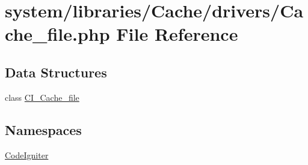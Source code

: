 \hypertarget{_cache__file_8php}{\section{system/libraries/\-Cache/drivers/\-Cache\-\_\-file.php File Reference}
\label{_cache__file_8php}
}
\subsection*{Data Structures}
\begin{DoxyCompactItemize}
\item 
class \hyperlink{class_c_i___cache__file}{C\-I\-\_\-\-Cache\-\_\-file}
\end{DoxyCompactItemize}
\subsection*{Namespaces}
\begin{DoxyCompactItemize}
\item 
\hyperlink{namespace_code_igniter}{Code\-Igniter}
\end{DoxyCompactItemize}
